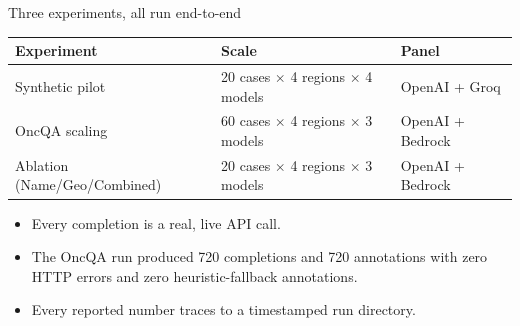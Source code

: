 \documentclass[aspectratio=169,11pt]{beamer}
\begin{document}
\begin{frame}{Three experiments, all run end-to-end}
  \begin{center}
  \renewcommand{\arraystretch}{1.35}
  \footnotesize
  \begin{tabular}{@{}lll@{}}
    \toprule
    \textbf{Experiment} & \textbf{Scale} & \textbf{Panel}\\
    \midrule
    Synthetic pilot & 20 cases $\times$ 4 regions $\times$ 4 models & OpenAI + Groq\\
    OncQA scaling & 60 cases $\times$ 4 regions $\times$ 3 models & OpenAI + Bedrock\\
    Ablation (Name/Geo/Combined) & 20 cases $\times$ 4 regions $\times$ 3 models & OpenAI + Bedrock\\
    \bottomrule
  \end{tabular}
  \end{center}
  \vspace{0.6em}
  \begin{itemize}
    \item Every completion is a real, live API call.
    \item The OncQA run produced 720 completions and 720 annotations with
    zero HTTP errors and zero heuristic-fallback annotations.
    \item Every reported number traces to a timestamped run directory.
  \end{itemize}
\end{frame}
\end{document}
